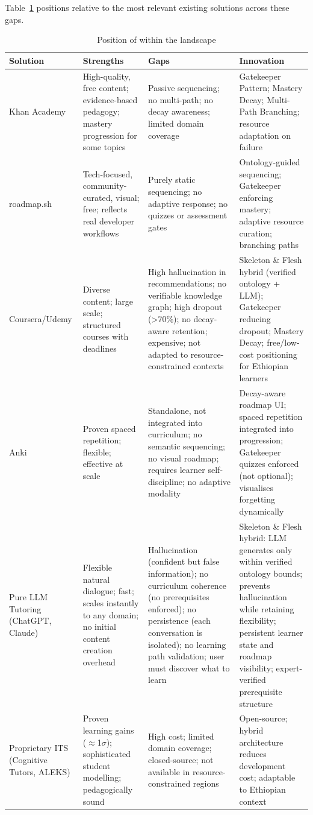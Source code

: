 Table~\ref{tab:landscape} positions \projectname{} relative to the most relevant existing solutions across these gaps.

\begin{table}[ht]
\centering
\caption{Position of \projectname{} within the landscape}
\label{tab:landscape}
\small
\begin{tabular}{@{}p{2.2cm}p{3cm}p{3.5cm}p{3.5cm}@{}}
\toprule
\textbf{Solution} & \textbf{Strengths} & \textbf{Gaps} & \textbf{\projectname{} Innovation} \\
\midrule
Khan Academy & High-quality, free content; evidence-based pedagogy; mastery progression for some topics & Passive sequencing; no multi-path; no decay awareness; limited domain coverage & Gatekeeper Pattern; Mastery Decay; Multi-Path Branching; resource adaptation on failure \\
roadmap.sh & Tech-focused, community-curated, visual; free; reflects real developer workflows & Purely static sequencing; no adaptive response; no quizzes or assessment gates & Ontology-guided sequencing; Gatekeeper enforcing mastery; adaptive resource curation; branching paths \\
Coursera/Udemy & Diverse content; large scale; structured courses with deadlines & High hallucination in recommendations; no verifiable knowledge graph; high dropout (>70\%); no decay-aware retention; expensive; not adapted to resource-constrained contexts & Skeleton \& Flesh hybrid (verified ontology + LLM); Gatekeeper reducing dropout; Mastery Decay; free/low-cost positioning for Ethiopian learners \\
Anki & Proven spaced repetition; flexible; effective at scale & Standalone, not integrated into curriculum; no semantic sequencing; no visual roadmap; requires learner self-discipline; no adaptive modality & Decay-aware roadmap UI; spaced repetition integrated into progression; Gatekeeper quizzes enforced (not optional); visualises forgetting dynamically \\
Pure LLM Tutoring (ChatGPT, Claude) & Flexible natural dialogue; fast; scales instantly to any domain; no initial content creation overhead & Hallucination (confident but false information); no curriculum coherence (no prerequisites enforced); no persistence (each conversation is isolated); no learning path validation; user must discover what to learn & Skeleton \& Flesh hybrid: LLM generates only within verified ontology bounds; prevents hallucination while retaining flexibility; persistent learner state and roadmap visibility; expert-verified prerequisite structure \\
Proprietary ITS (Cognitive Tutors, ALEKS) & Proven learning gains (\(\approx\)1\(\sigma\)); sophisticated student modelling; pedagogically sound & High cost; limited domain coverage; closed-source; not available in resource-constrained regions & Open-source; hybrid architecture reduces development cost; adaptable to Ethiopian context \\
\bottomrule
\end{tabular}
\end{table}

